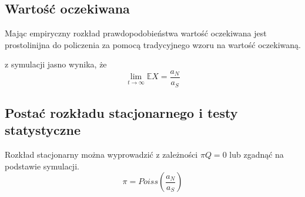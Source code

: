 \documentclass{article}
\begin{document}
\subsection{Wartość oczekiwana}

Mając empiryczny rozkład prawdopodobieństwa wartość oczekiwana jest prostolinijna do policzenia za pomocą tradycyjnego wzoru na wartość oczekiwaną.

z symulacji jasno wynika, że \[\lim_{t\rightarrow \infty}\mathbb{E}X = \frac{a_N}{a_S}\]
\subsection{Postać rozkładu stacjonarnego i testy statystyczne}
Rozkład stacjonarny można wyprowadzić z zależności $\pi  Q = 0$ lub zgadnąć na podstawie symulacji. 
\[\pi = Poiss(\frac{a_N}{a_S})\]
\end{document}
